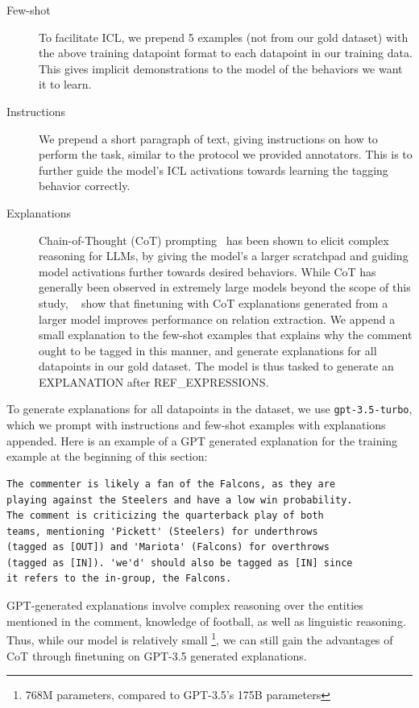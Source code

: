 \begin{description}
    \item[Few-shot] To facilitate ICL, we prepend 5 examples (not from our gold dataset) with the above training datapoint format to each datapoint in our training data. This gives implicit demonstrations to the model of the behaviors we want it to learn.
    \item[Instructions] We prepend a short paragraph of text, giving instructions on how to perform the task, similar to the protocol we provided annotators. This is to further guide the model's ICL activations towards learning the tagging behavior correctly.
    \item[Explanations] Chain-of-Thought (CoT) prompting~\citep{NEURIPS2022_9d560961} has been shown to elicit complex reasoning for LLMs, by giving the model's a larger scratchpad and guiding model activations further towards desired behaviors. While CoT has generally been observed in extremely large models beyond the scope of this study, ~\citet{Wadhwa2023RevisitingRE} show that finetuning with CoT explanations generated from a larger model improves performance on relation extraction. We append a small explanation to the few-shot examples that explains why the comment ought to be tagged in this manner, and generate explanations for all datapoints in our gold dataset. The model is thus tasked to generate an EXPLANATION after REF\_EXPRESSIONS.
\end{description}

To generate explanations for all datapoints in the dataset, we use \texttt{gpt-3.5-turbo}, which we prompt with instructions and few-shot examples with explanations appended. Here is an example of a GPT generated explanation for the training example at the beginning of this section:

\begin{verbatim}
The commenter is likely a fan of the Falcons, as they are 
playing against the Steelers and have a low win probability. 
The comment is criticizing the quarterback play of both 
teams, mentioning 'Pickett' (Steelers) for underthrows 
(tagged as [OUT]) and 'Mariota' (Falcons) for overthrows 
(tagged as [IN]). 'we'd' should also be tagged as [IN] since 
it refers to the in-group, the Falcons.
\end{verbatim}

GPT-generated explanations involve complex reasoning over the entities mentioned in the comment, knowledge of football, as well as linguistic reasoning. Thus, while our model is relatively small \footnote{768M parameters, compared to GPT-3.5's 175B parameters}, we can still gain the advantages of CoT through finetuning on GPT-3.5 generated explanations.

